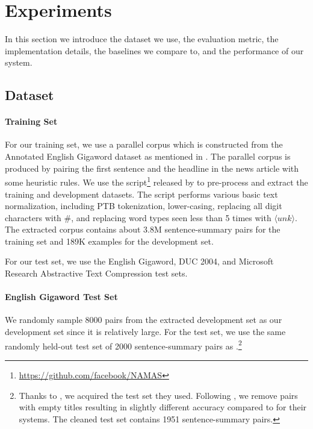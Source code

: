 \documentclass[11pt,a4paper]{article}
\newcommand{\unk}{$ \langle \textit{unk} \rangle $}
\begin{document}
 
\newcommand{\significant}{$ {}^{\text{\textbf{-}}} $}
\newcommand{\otherpaper}{$ {}^{\ddag} $}

\section{Experiments}
\label{sec:expr}
In this section we introduce the dataset we use, the evaluation metric, the implementation details, the baselines we compare to, and the performance of our system.
\subsection{Dataset}
\paragraph{Training Set}
For our training set, we use a parallel corpus which is constructed from the Annotated English Gigaword dataset \citep{Napoles:2012:AG:2391200.2391218} as mentioned in \citet{rush-chopra-weston:2015:EMNLP}.
The parallel corpus is produced by pairing the first sentence and the headline in the news article with some heuristic rules. 
We use the script\footnote{\label{ft:absCode}\url{https://github.com/facebook/NAMAS}} released by \citet{rush-chopra-weston:2015:EMNLP} to pre-process and extract the training and development datasets.
The script performs various basic text normalization, including PTB tokenization, lower-casing, replacing all digit characters with \#, and replacing word types seen less than 5 times with \unk{}.
The extracted corpus contains about 3.8M sentence-summary pairs for the training set and 189K examples for the development set.

For our test set, we use the English Gigaword, DUC 2004, and Microsoft Research Abstractive Text Compression test sets.

\paragraph{English Gigaword Test Set}

We randomly sample 8000 pairs from the extracted development set as our development set since it is relatively large.
For the test set, we use the same randomly held-out test set of 2000 sentence-summary pairs as \citet{rush-chopra-weston:2015:EMNLP}.\footnote{Thanks to \citet{rush-chopra-weston:2015:EMNLP}, we acquired the test set they used. Following \citet{chopra-auli-rush:2016:N16-1}, we remove pairs with empty titles resulting in slightly different accuracy compared to \citet{rush-chopra-weston:2015:EMNLP} for their systems. The cleaned test set contains 1951 sentence-summary pairs.}
\end{document}

